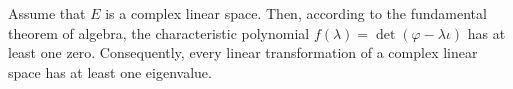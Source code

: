 Assume that $E$ is a complex linear space. Then, according to the fundamental theorem of algebra, the characteristic polynomial $f(\lambda) = \det(\varphi - \lambda \iota)$ has at least one zero. Consequently, every linear transformation of a complex linear space has at least one eigenvalue.
